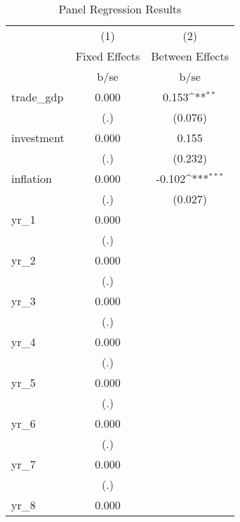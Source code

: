 \begin{table}[htbp]\centering
\def\sym#1{\ifmmode^{#1}\else\(^{#1}\)\fi}
\caption{Panel Regression Results}
\begin{tabular}{l*{2}{c}}
\hline\hline
            &\multicolumn{1}{c}{(1)}&\multicolumn{1}{c}{(2)}\\
            &\multicolumn{1}{c}{Fixed Effects}&\multicolumn{1}{c}{Between Effects}\\
            &        b/se         &        b/se         \\
\hline
trade\_gdp   &       0.000         &       0.153\sym{**} \\
            &         (.)         &     (0.076)         \\
investment  &       0.000         &       0.155         \\
            &         (.)         &     (0.232)         \\
inflation   &       0.000         &      -0.102\sym{***}\\
            &         (.)         &     (0.027)         \\
yr\_1        &       0.000         &                     \\
            &         (.)         &                     \\
yr\_2        &       0.000         &                     \\
            &         (.)         &                     \\
yr\_3        &       0.000         &                     \\
            &         (.)         &                     \\
yr\_4        &       0.000         &                     \\
            &         (.)         &                     \\
yr\_5        &       0.000         &                     \\
            &         (.)         &                     \\
yr\_6        &       0.000         &                     \\
            &         (.)         &                     \\
yr\_7        &       0.000         &                     \\
            &         (.)         &                     \\
yr\_8        &       0.000         &                     \\

\end{tabular}
\end{table}
